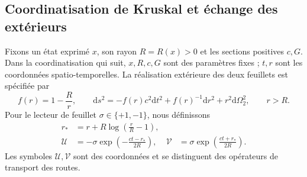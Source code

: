 

\subsection{Coordinatisation de Kruskal et échange des extérieurs}
\label{vii:subsec:kruskal-dos-hojas}

Fixons un état exprimé \(x\), son rayon \(R=R(x)>0\) et les sections positives \(c,G\). Dans la coordinatisation qui suit, \(x,R,c,G\) sont des paramètres fixes ; \(t,r\) sont les coordonnées spatio-temporelles. La réalisation extérieure des deux feuillets est spécifiée par
\begin{equation}
 f(r)=1-\frac Rr,\qquad
 \mathrm ds^2=-f(r)c^2\mathrm dt^2+f(r)^{-1}\mathrm dr^2
                 +r^2\mathrm d\Omega_2^2,\qquad r>R.
 \label{vii:eq:metrica-exterior}
\end{equation}
Pour le lecteur de feuillet \(\sigma\in\{+1,-1\}\), nous définissons
\begin{align}
 r_*&=r+R\log\left(\frac rR-1\right),\\
 \mathcal U&=-\sigma\exp\left(-\frac{ct-r_*}{2R}\right),&
 \mathcal V&=\sigma\exp\left(\frac{ct+r_*}{2R}\right).
 \label{vii:eq:carta-kruskal}
\end{align}
Les symboles \(\mathcal U,\mathcal V\) sont des coordonnées et se
distinguent des opérateurs de transport des routes.

